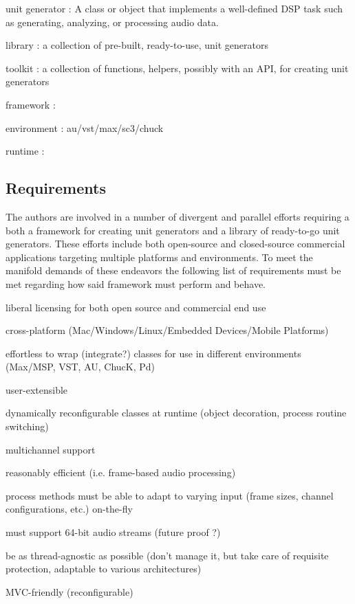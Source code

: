 \documentclass[twoside,10pt]{article}
\newenvironment{packed_item}{
\begin{itemize}
  \setlength{\itemsep}{1pt}
  \setlength{\parskip}{0pt}
  \setlength{\parsep}{0pt}
}{\end{itemize}}
\begin{document}
\begin{packed_item}%
	\item unit generator : A class or object that implements a well-defined DSP task such as generating, analyzing, or processing audio data.
	\item library : a collection of pre-built, ready-to-use, unit generators
	\item toolkit	: a collection of functions, helpers, possibly with an API, for creating unit generators
	\item framework : 
	\item environment : au/vst/max/sc3/chuck
	\item runtime : 
\end{packed_item}%


\subsection{Requirements}

The authors are involved in a number of divergent and parallel efforts requiring a both a framework for creating unit generators and a library of ready-to-go unit generators.  These efforts include both open-source and closed-source commercial applications targeting multiple platforms and environments.  To meet the manifold demands of these endeavors the following list of requirements must be met regarding how said framework must perform and behave.

\begin{packed_item}%
	\item liberal licensing for both open source and commercial end use
	\item cross-platform (Mac/Windows/Linux/Embedded Devices/Mobile Platforms)	
	\item effortless to wrap (integrate?) classes for use in different environments (Max/MSP, VST, AU, ChucK, Pd)
	\item user-extensible
	\item dynamically reconfigurable classes at runtime (object decoration, process routine switching)
	\item multichannel support
	\item reasonably efficient (i.e. frame-based audio processing)
	\item process methods must be able to adapt to varying input (frame sizes, channel configurations, etc.) on-the-fly
	\item must support 64-bit audio streams (future proof ?)
	\item be as thread-agnostic as possible (don't manage it, but take care of requisite protection, adaptable to various architectures)
	\item MVC-friendly (reconfigurable)
\end{packed_item}%
\end{document}
